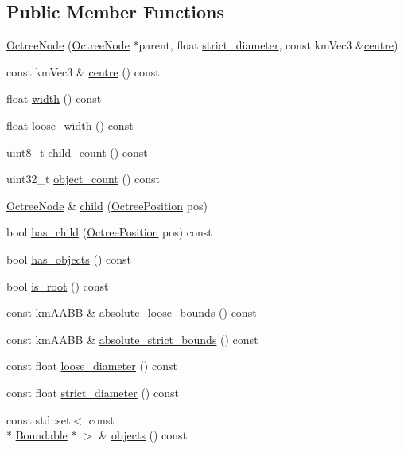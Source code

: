 \subsection*{Public Member Functions}
\begin{DoxyCompactItemize}
\item 
\hyperlink{classkglt_1_1_octree_node_a8e6ec3164a3d983c9c530ba6cf7ee660}{Octree\-Node} (\hyperlink{classkglt_1_1_octree_node}{Octree\-Node} $\ast$parent, float \hyperlink{classkglt_1_1_octree_node_a69486155b0a07811aa3d4a0c233c888f}{strict\-\_\-diameter}, const km\-Vec3 \&\hyperlink{classkglt_1_1_octree_node_a705a2812fbed59fa43187f9b17cda437}{centre})
\item 
const km\-Vec3 \& \hyperlink{classkglt_1_1_octree_node_a705a2812fbed59fa43187f9b17cda437}{centre} () const 
\item 
float \hyperlink{classkglt_1_1_octree_node_a22443aef9a8bb13fa5dac39029cc0d62}{width} () const 
\item 
float \hyperlink{classkglt_1_1_octree_node_a805234db93845a1026740010b0f32619}{loose\-\_\-width} () const 
\item 
uint8\-\_\-t \hyperlink{classkglt_1_1_octree_node_ae5ef2b6f715f1947c175b52fb7693b1a}{child\-\_\-count} () const 
\item 
uint32\-\_\-t \hyperlink{classkglt_1_1_octree_node_a92f0e68922af5c8b814dc99a76126653}{object\-\_\-count} () const 
\item 
\hyperlink{classkglt_1_1_octree_node}{Octree\-Node} \& \hyperlink{classkglt_1_1_octree_node_a36a9d7aa5d9875c766d306db1ebed243}{child} (\hyperlink{namespacekglt_a48bd86b20d4662f7c170d4796a3de0d4}{Octree\-Position} pos)
\item 
bool \hyperlink{classkglt_1_1_octree_node_ad4c400c57daef70bab64e0adf62d682f}{has\-\_\-child} (\hyperlink{namespacekglt_a48bd86b20d4662f7c170d4796a3de0d4}{Octree\-Position} pos) const 
\item 
bool \hyperlink{classkglt_1_1_octree_node_aa7101988c3bbff868b2e3c97c385185c}{has\-\_\-objects} () const 
\item 
bool \hyperlink{classkglt_1_1_octree_node_a34a819152d481dc033cac5e4d3131d22}{is\-\_\-root} () const 
\item 
const km\-A\-A\-B\-B \& \hyperlink{classkglt_1_1_octree_node_aff596a2f4be7ae65988a0692d9dd8eab}{absolute\-\_\-loose\-\_\-bounds} () const 
\item 
const km\-A\-A\-B\-B \& \hyperlink{classkglt_1_1_octree_node_a712bd013681d837487348125c7e52152}{absolute\-\_\-strict\-\_\-bounds} () const 
\item 
const float \hyperlink{classkglt_1_1_octree_node_a5d72e2fb5911f0a64a1ea460811ba53a}{loose\-\_\-diameter} () const 
\item 
const float \hyperlink{classkglt_1_1_octree_node_a69486155b0a07811aa3d4a0c233c888f}{strict\-\_\-diameter} () const 
\item 
const std\-::set$<$ const \\*
\hyperlink{classkglt_1_1_boundable}{Boundable} $\ast$ $>$ \& \hyperlink{classkglt_1_1_octree_node_ad31fac5f1d4e81b792a56b7e52181b5e}{objects} () const 
\end{DoxyCompactItemize}
